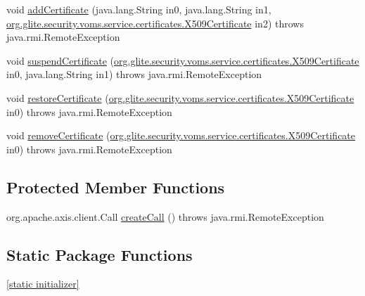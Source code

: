 \begin{DoxyCompactItemize}
\item 
void \hyperlink{classorg_1_1glite_1_1security_1_1voms_1_1service_1_1certificates_1_1VOMSCertificatesSoapBindingStub_ace7569d74867a19d0054985e9e1c756b}{addCertificate} (java.lang.String in0, java.lang.String in1, \hyperlink{classorg_1_1glite_1_1security_1_1voms_1_1service_1_1certificates_1_1X509Certificate}{org.glite.security.voms.service.certificates.X509Certificate} in2)  throws java.rmi.RemoteException 
\item 
void \hyperlink{classorg_1_1glite_1_1security_1_1voms_1_1service_1_1certificates_1_1VOMSCertificatesSoapBindingStub_ac4c3e55c6411b043ce8f425620acc2e9}{suspendCertificate} (\hyperlink{classorg_1_1glite_1_1security_1_1voms_1_1service_1_1certificates_1_1X509Certificate}{org.glite.security.voms.service.certificates.X509Certificate} in0, java.lang.String in1)  throws java.rmi.RemoteException 
\item 
void \hyperlink{classorg_1_1glite_1_1security_1_1voms_1_1service_1_1certificates_1_1VOMSCertificatesSoapBindingStub_afe3145342d70a6112ec165773c6e9b5f}{restoreCertificate} (\hyperlink{classorg_1_1glite_1_1security_1_1voms_1_1service_1_1certificates_1_1X509Certificate}{org.glite.security.voms.service.certificates.X509Certificate} in0)  throws java.rmi.RemoteException 
\item 
void \hyperlink{classorg_1_1glite_1_1security_1_1voms_1_1service_1_1certificates_1_1VOMSCertificatesSoapBindingStub_abaf833412097e7039ef3abe8fff6dd71}{removeCertificate} (\hyperlink{classorg_1_1glite_1_1security_1_1voms_1_1service_1_1certificates_1_1X509Certificate}{org.glite.security.voms.service.certificates.X509Certificate} in0)  throws java.rmi.RemoteException 
\end{DoxyCompactItemize}
\subsection*{Protected Member Functions}
\begin{DoxyCompactItemize}
\item 
org.apache.axis.client.Call \hyperlink{classorg_1_1glite_1_1security_1_1voms_1_1service_1_1certificates_1_1VOMSCertificatesSoapBindingStub_a82436d41869dc562a8568c97eee119e7}{createCall} ()  throws java.rmi.RemoteException 
\end{DoxyCompactItemize}
\subsection*{Static Package Functions}
\begin{DoxyCompactItemize}
\item 
\hyperlink{classorg_1_1glite_1_1security_1_1voms_1_1service_1_1certificates_1_1VOMSCertificatesSoapBindingStub_a3cf8ff6a466262e63d30094978468368}{\mbox{[}static initializer\mbox{]}}
\end{DoxyCompactItemize}

